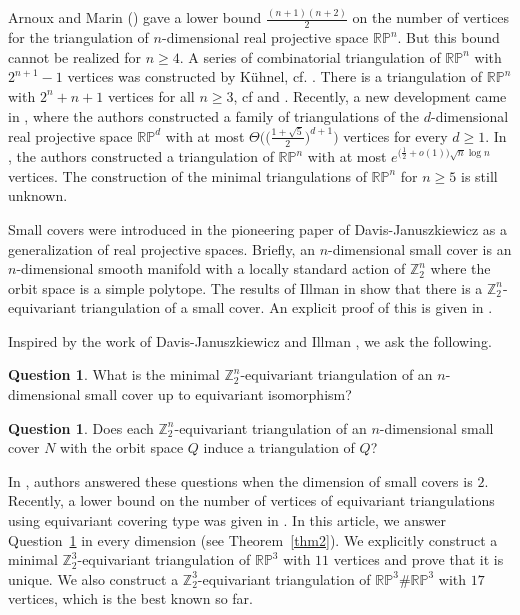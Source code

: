 \documentclass[11pt]{amsart}
\numberwithin{equation}{section}
\theoremstyle{definition}
\newtheorem{ques}[theorem]{Question}
\newcommand{\RP}{\mathbb{RP}}
\def \bb{\mathbb}
\def \ZZ{{\bb{Z}}}
\begin{document}
Arnoux and Marin (\cite{AM}) gave a lower bound $\frac{(n+1)(n+2)}{2}$ on the number of vertices for the triangulation of $n$-dimensional real projective space $\mathbb{RP}^n$. But this bound cannot be realized for $n \geq 4$. A series of combinatorial triangulation of $\mathbb{RP}^n$ with $2^{n+1} - 1$ vertices was constructed by K\"{u}hnel, cf. \cite{Ku}. There is a triangulation of $\mathbb{RP}^n$ with $2^n+n+1$ vertices for all $n \geq 3$, cf \cite[Theorem 3.24]{BS} and \cite[Proposition 4.3]{Kusp2023}. Recently, a new development came in  \cite{venturello2021new}, where the authors constructed a family of triangulations of the $d$-dimensional real projective space $\mathbb{RP}^d$ with at most $\Theta\bigl(\bigl(\frac{1+\sqrt{5}}{2}\bigr)^{d+1}\bigr)$ vertices for every $d \geq 1$. In \cite{Adi}, the authors constructed a triangulation of $\mathbb{RP}^n$ with at most $e^{\bigl(\frac12 + o(1)\bigr) \sqrt{n} \log n}$ vertices.
The construction of the minimal triangulations of $\mathbb{RP}^n$ for $n\geq 5$ is still unknown.


Small covers were introduced in the pioneering paper of Davis-Januszkiewicz \cite{DJ} as a generalization of real projective spaces. Briefly, an $n$-dimensional small cover is an $n$-dimensional smooth manifold with a locally standard action of $\ZZ_2^n$ where the orbit space is a simple polytope.
The results of Illman in \cite{Il} show that there is a $\ZZ_2^n$-equivariant triangulation of a small cover. An explicit proof of this is given in \cite[Lemma 3.6]{BS}. 

Inspired by the work of Davis-Januszkiewicz \cite{DJ} and Illman \cite{Il}, we ask the following.
\begin{ques}\label{qu1}
What is the  minimal $\ZZ_2^n$-equivariant triangulation of an $n$-dimensional small cover up to equivariant isomorphism?
\end{ques}
\begin{ques}\label{qu}
 Does each $\ZZ_2^n$-equivariant triangulation of an $n$-dimensional small cover $N$ with the orbit space $Q$ induce a triangulation of $Q$?
\end{ques}
In \cite{BS}, authors answered these questions when the dimension of small covers is $2$. Recently, a lower bound on the number of vertices of equivariant triangulations using equivariant covering type was given in \cite{govc2024equivariant}. In this article, we answer Question~\ref{qu} in every dimension (see Theorem~\ref{thm2}). We explicitly construct a minimal $\ZZ_2^3$-equivariant triangulation of $\RP^3$ with $11$ vertices and prove that it is unique. We also construct a $\ZZ_2^3$-equivariant triangulation of $\RP^3 \# \RP^3$ with $17$ vertices, which is the best known so far.
\end{document}
